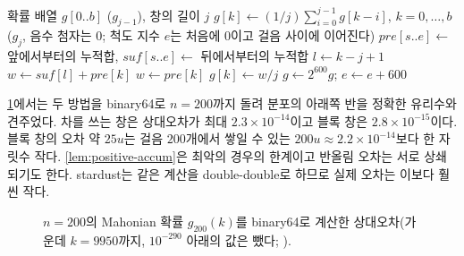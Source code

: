\begin{algorithm}[htbp]
\begin{algorithmic}[1]
\Require 확률 배열 $g[0..b]$ ($g_{j-1}$), 창의 길이 $j$
\Ensure $g[k]\gets(1/j)\sum_{i=0}^{j-1}g[k-i]$, $k=0,\dots,b$ ($g_j$, 음수 첨자는 $0$; 척도 지수 $e$는 처음에 $0$이고 걸음 사이에 이어진다)
 
  \State $\mathit{pre}[s..e]\gets$ 앞에서부터의 누적합, $\mathit{suf}[s..e]\gets$ 뒤에서부터의 누적합
\EndFor
{}
  \State $l\gets k-j+1$ 
    \State $w\gets\mathit{suf}[l]+\mathit{pre}[k]$ 
  \Else
    \State $w\gets\mathit{pre}[k]$
  \EndIf
  \State $g[k]\gets w/j$ 
\EndFor
{} $g\gets2^{600}g$; $e\gets e+600$ 
\EndIf
\end{algorithmic}
\caption{뺄셈 없는 창의 합으로 Mahonian 확률을 한 단계 넘기기 (stardust )}
\label{alg:block-window}
\end{algorithm}

\cref{fig:windows}에서는 두 방법을 binary64로 $n=200$까지 돌려 분포의 아래쪽 반을 정확한 유리수와 견주었다. 차를 쓰는 창은 상대오차가 최대 $2.3\times10^{-14}$이고 블록 창은 $2.8\times10^{-15}$이다. 블록 창의 오차 약 $25u$는 걸음 $200$개에서 쌓일 수 있는 $200u\approx2.2\times10^{-14}$보다 한 자릿수 작다. \cref{lem:positive-accum}은 최악의 경우의 한계이고 반올림 오차는 서로 상쇄되기도 한다. stardust는 같은 계산을 double-double로 하므로 실제 오차는 이보다 훨씬 작다.

\begin{figure}[htbp]
\centering
{}
\caption{$n=200$의 Mahonian 확률 $g_{200}(k)$를 binary64로 계산한 상대오차(가운데 $k=9950$까지, $10^{-290}$ 아래의 값은 뺐다; ).}
\label{fig:windows}
\end{figure}

